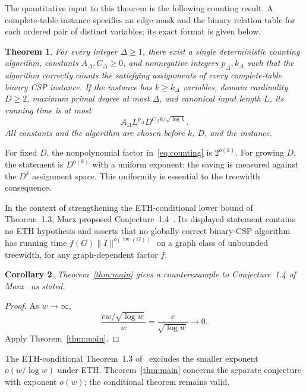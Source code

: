 \documentclass[11pt,reqno]{amsart}
\numberwithin{equation}{section}
\newtheorem{theorem}{Theorem}[section]
\newtheorem{corollary}[theorem]{Corollary}
\theoremstyle{definition}
\theoremstyle{remark}
\newcommand{\tw}{\operatorname{tw}}
\begin{document}
The quantitative input to this theorem is the following counting result. A complete-table instance specifies an edge mask and the binary relation table for each ordered pair of distinct variables; its exact format is given below.

\begin{theorem}\label{thm:counting}
For every integer $\Delta\ge1$, there exist a single deterministic counting algorithm, constants $A_\Delta,C_\Delta\ge0$, and nonnegative integers $p_\Delta,k_\Delta$ such that the algorithm correctly counts the satisfying assignments of every complete-table binary CSP instance. If the instance has $k\ge k_\Delta$ variables, domain cardinality $D\ge2$, maximum primal degree at most $\Delta$, and canonical input length $L$, its running time is at most
\begin{equation}\label{eq:counting}
 A_\Delta L^{p_\Delta}D^{C_\Delta k/\sqrt{\log k}}.
\end{equation}
All constants and the algorithm are chosen before $k$, $D$, and the instance.
\end{theorem}

For fixed $D$, the nonpolynomial factor in~\eqref{eq:counting} is $2^{o(k)}$. For growing $D$, the statement is $D^{o(k)}$ with a uniform exponent: the saving is measured against the $D^k$ assignment space. This uniformity is essential to the treewidth consequence.

In the context of strengthening the ETH-conditional lower bound of Theorem~1.3, Marx proposed Conjecture~1.4~\cite[p.~88]{Marx10}. Its displayed statement contains no ETH hypothesis and asserts that no globally correct binary-CSP algorithm has running time $f(G)\lVert I\rVert^{o(\tw(G))}$ on a graph class of unbounded treewidth, for any graph-dependent factor $f$.

\begin{corollary}\label{cor:marx}
Theorem~\ref{thm:main} gives a counterexample to Conjecture~1.4 of Marx~\cite{Marx10} as stated.
\end{corollary}
\begin{proof}
As $w\to\infty$,
\[
 \frac{c w/\sqrt{\log w}}{w}=\frac{c}{\sqrt{\log w}}\longrightarrow0.
\]
Apply Theorem~\ref{thm:main}.
\end{proof}

The ETH-conditional Theorem~1.3 of~\cite{Marx10} excludes the smaller exponent $o(w/\log w)$ under ETH. Theorem~\ref{thm:main} concerns the separate conjecture with exponent $o(w)$; the conditional theorem remains valid.
\end{document}
